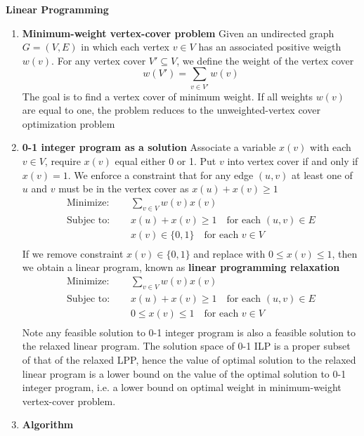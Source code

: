 \documentclass[11pt]{article}
\begin{document}
\begin{defn*}
    \textbf{Linear Programming}
    \begin{enumerate}
        \item \textbf{Minimum-weight vertex-cover problem} Given an undirected graph $G = (V,E)$ in which each vertex $v\in V$ has an associated positive weigth $w(v)$. For any vertex cover $V' \subseteq V$, we define the weight of the vertex cover
        \[
            w(V') = \sum_{v\in V'} w(v)
        \]
        The goal is to find a vertex cover of minimum weight. If all weights $w(v)$ are equal to one, the problem reduces to the unweighted-vertex cover optimization problem  
        \item \textbf{0-1 integer program as a solution} Associate a variable $x(v)$ with each $v\in V$, require $x(v)$ equal either 0 or 1. Put $v$ into vertex cover if and only if $x(v) =1$. We enforce a constraint that for any edge $(u,v)$ at least one of $u$ and $v$ must be in the vertex cover as $x(u) + x(v) \geq 1$
        \begin{align*}
            \text{Minimize: } \quad & \sum_{v\in V} w(v) x(v)\\
            \text{Subjec to: } \quad & x(u) + x(v) \geq 1 \quad \text{for each } (u,v)\in E \\
            & x(v)\in \{0,1\}\quad \text{for each } v\in V\\
        \end{align*}
        If we remove constraint $x(v)\in \{0,1\}$ and replace with $0\leq x(v) \leq 1$, then we obtain a linear program, known as \textbf{linear programming relaxation} 
        \begin{align*}
            \text{Minimize: } \quad & \sum_{v\in V} w(v) x(v)\\
            \text{Subjec to: } \quad & x(u) + x(v) \geq 1 \quad \text{for each } (u,v)\in E \\
            & 0\leq x(v)\leq 1 \quad \text{for each } v\in V\\
        \end{align*}
        Note any feasible solution to 0-1 integer program is also a feasible solution to the relaxed linear program. The solution space of 0-1 ILP is a proper subset of that of the relaxed LPP, hence the value of optimal solution to the relaxed linear program is a lower bound on the value of the optimal solution to 0-1 integer program, i.e. a lower bound on optimal weight in minimum-weight vertex-cover problem. 
        \item \textbf{Algorithm}

\end{enumerate}
\end{defn*}
\end{document}
